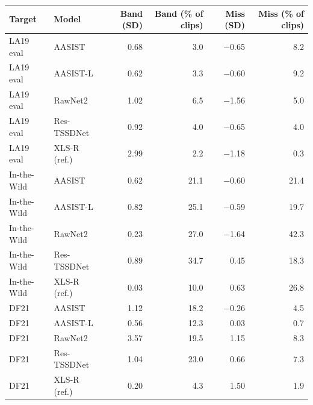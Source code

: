 \begin{tabular}{@{}llrrrr@{}}
\toprule
Target & Model & Band (SD) & Band (\% of clips) & Miss (SD) & Miss (\% of clips) \\
\midrule
LA19 eval & AASIST & 0.68 & 3.0 & $-$0.65 & 8.2 \\
LA19 eval & AASIST-L & 0.62 & 3.3 & $-$0.60 & 9.2 \\
LA19 eval & RawNet2 & 1.02 & 6.5 & $-$1.56 & 5.0 \\
LA19 eval & Res-TSSDNet & 0.92 & 4.0 & $-$0.65 & 4.0 \\
LA19 eval & XLS-R (ref.) & 2.99 & 2.2 & $-$1.18 & 0.3 \\
\midrule
In-the-Wild & AASIST & 0.62 & 21.1 & $-$0.60 & 21.4 \\
In-the-Wild & AASIST-L & 0.82 & 25.1 & $-$0.59 & 19.7 \\
In-the-Wild & RawNet2 & 0.23 & 27.0 & $-$1.64 & 42.3 \\
In-the-Wild & Res-TSSDNet & 0.89 & 34.7 & 0.45 & 18.3 \\
In-the-Wild & XLS-R (ref.) & 0.03 & 10.0 & 0.63 & 26.8 \\
\midrule
DF21 & AASIST & 1.12 & 18.2 & $-$0.26 & 4.5 \\
DF21 & AASIST-L & 0.56 & 12.3 & 0.03 & 0.7 \\
DF21 & RawNet2 & 3.57 & 19.5 & 1.15 & 8.3 \\
DF21 & Res-TSSDNet & 1.04 & 23.0 & 0.66 & 7.3 \\
DF21 & XLS-R (ref.) & 0.20 & 4.3 & 1.50 & 1.9 \\
\bottomrule
\end{tabular}
